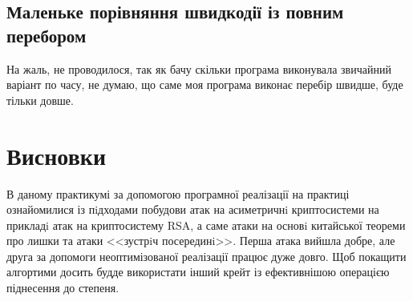 \subsection{Маленьке порівняння швидкодії із повним перебором}
На жаль, не проводилося, так як бачу скільки програма виконувала звичайний варіант по часу, не думаю, що саме моя програма виконає перебір швидше, буде тільки довше.

\section{Висновки}
В даному практикумі за допомогою програмної реалізації на практиці ознайомилися із пiдходами побудови атак на асиметричнi криптосистеми на прикладi атак на криптосистему RSA, а саме атаки на основi китайської теореми про лишки та атаки <<зустрiч посерединi>>. Перша атака вийшла добре, але друга за допомоги неоптимізованої реалізації працює дуже довго. Щоб покащити алгортими досить будде використати інший крейт із ефективнішою операцією піднесення до степеня.
